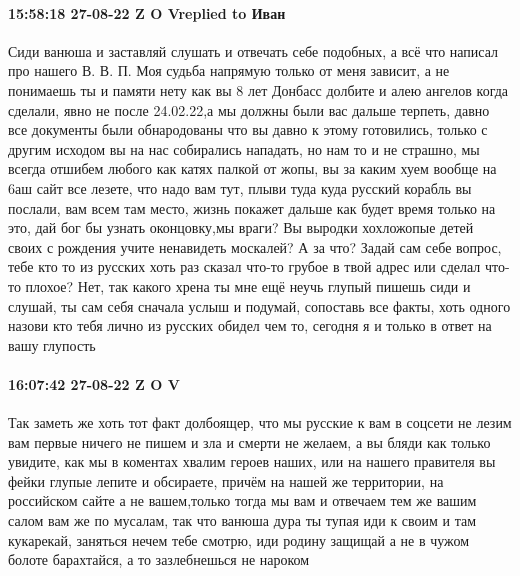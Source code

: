  
 
 
 
 

\paragraph{15:58:18 27-08-22 Z O Vreplied to Иван}

Сиди ванюша и заставляй слушать и отвечать себе подобных, а всё что написал про
нашего В. В. П. Моя судьба напрямую только от меня зависит, а не понимаешь ты и
памяти нету как вы 8 лет Донбасс долбите и алею ангелов когда сделали, явно не
после 24.02.22,а мы должны были вас дальше терпеть, давно все документы были
обнародованы что вы давно к этому готовились, только с другим исходом вы на нас
собирались нападать, но нам то и не страшно, мы всегда отшибем любого как катях
палкой от жопы, вы за каким хуем вообще на 6аш сайт все лезете, что надо вам
тут, плыви туда куда русский корабль вы послали, вам всем там место, жизнь
покажет дальше как будет время только на это, дай бог бы узнать оконцовку,мы
враги? Вы выродки хохложопые детей своих с рождения учите ненавидеть москалей?
А за что? Задай сам себе вопрос, тебе кто то из русских хоть раз сказал что-то
грубое в твой адрес или сделал что-то плохое? Нет, так какого хрена ты мне ещё
неучь глупый пишешь сиди и слушай, ты сам себя сначала услыш и подумай,
сопоставь все факты, хоть одного назови кто тебя лично из русских обидел чем
то, сегодня я и только в ответ на вашу глупость

\paragraph{16:07:42 27-08-22 Z O V}

Так заметь же хоть тот факт долбоящер, что мы русские к вам в соцсети не лезим
вам первые ничего не пишем и зла и смерти не желаем, а вы бляди как только
увидите, как мы в коментах хвалим героев наших, или на нашего правителя вы
фейки глупые лепите и обсираете, причём на нашей же территории, на российском
сайте а не вашем,только тогда мы вам и отвечаем тем же вашим салом вам же по
мусалам, так что ванюша дура ты тупая иди к своим и там кукарекай, заняться
нечем тебе смотрю, иди родину защищай а не в чужом болоте барахтайся, а то
зазлебнешься не нароком

